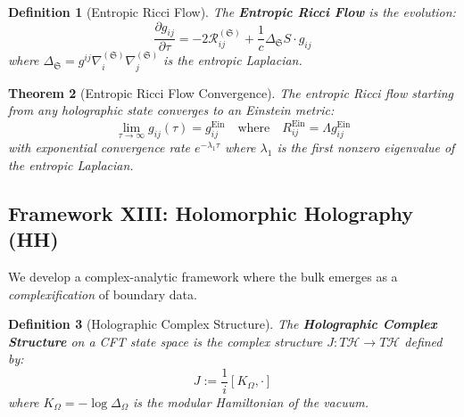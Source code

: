 \documentclass[12pt,a4paper]{article}
\newtheorem{theorem}{Theorem}[section]
\newtheorem{definition}[theorem]{Definition}
\begin{document}
\begin{definition}[Entropic Ricci Flow]\label{def:entropic-ricci-flow}
The \textbf{Entropic Ricci Flow} is the evolution:
\begin{equation}
\frac{\partial g_{ij}}{\partial \tau} = -2\mathcal{R}^{(\mathfrak{S})}_{ij} + \frac{1}{c} \Delta_{\mathfrak{S}} S \cdot g_{ij}
\end{equation}
where $\Delta_{\mathfrak{S}} = g^{ij}\nabla^{(\mathfrak{S})}_i \nabla^{(\mathfrak{S})}_j$ is the entropic Laplacian.
\end{definition}

\begin{theorem}[Entropic Ricci Flow Convergence]\label{thm:entropic-ricci-convergence}
The entropic Ricci flow starting from any holographic state converges to an Einstein metric:
\begin{equation}
\lim_{\tau \to \infty} g_{ij}(\tau) = g_{ij}^{\text{Ein}} \quad \text{where} \quad R_{ij}^{\text{Ein}} = \Lambda g_{ij}^{\text{Ein}}
\end{equation}
with exponential convergence rate $e^{-\lambda_1 \tau}$ where $\lambda_1$ is the first nonzero eigenvalue of the entropic Laplacian.
\end{theorem}

\subsection{Framework XIII: Holomorphic Holography (HH)}

We develop a complex-analytic framework where the bulk emerges as a \emph{complexification} of boundary data.

\begin{definition}[Holographic Complex Structure]\label{def:holo-complex}
The \textbf{Holographic Complex Structure} on a CFT state space is the complex structure $J: T\mathcal{H} \to T\mathcal{H}$ defined by:
\begin{equation}
J := \frac{1}{i}[K_\Omega, \cdot]
\end{equation}
where $K_\Omega = -\log \Delta_\Omega$ is the modular Hamiltonian of the vacuum.
\end{definition}
\end{document}
